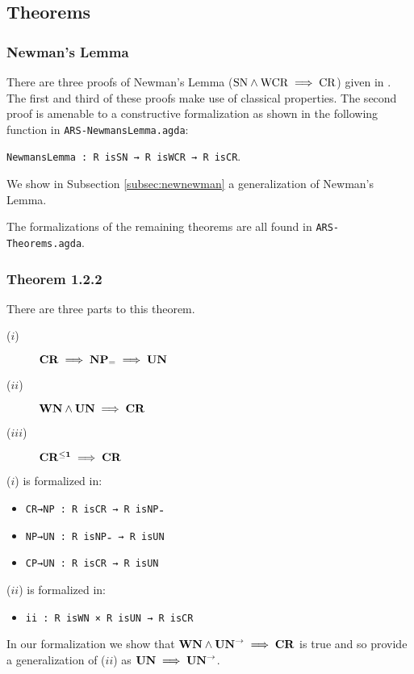 \subsection{Theorems}
\subsubsection{Newman's Lemma}
There are three proofs of Newman's Lemma ($\mathrm{SN} \land \mathrm{WCR} \implies \mathrm{CR}$) given in \terese. 
The first and third of these proofs make use of classical properties. The second proof is amenable to a 
constructive formalization as shown in the following function in \texttt{ARS-NewmansLemma.agda}:

\verb|NewmansLemma : R isSN → R isWCR → R isCR|.


We show in Subsection \ref{subsec:newnewman} a generalization of Newman's Lemma. 

The formalizations of the remaining theorems are all found in \texttt{ARS-Theorems.agda}. 
\subsubsection{Theorem 1.2.2}
There are three parts to this theorem. 
\begin{description}
    \item[($i$)] $\mathbf{CR} \implies \mathbf{NP_=} \implies \mathbf{UN}$
    \item[($ii$)] $\mathbf{WN} \land \mathbf{UN} \implies \mathbf{CR}$  
    \item[($iii$)] $\mathbf{CR^{\le 1}} \implies \mathbf{CR}$
\end{description}

($i$) is formalized in:
\begin{itemize}
    \item \verb|CR→NP : R isCR → R isNP₌|
    \item \verb|NP→UN : R isNP₌ → R isUN|
    \item \verb|CP→UN : R isCR → R isUN|
\end{itemize}

($ii$) is formalized in:
\begin{itemize}
    \item \verb|ii : R isWN × R isUN → R isCR|
\end{itemize}
In our formalization we show that $\mathbf{WN} \land \mathbf{UN}^{\to} \implies \mathbf{CR}$ is true and so provide a generalization of ($ii$) as $\mathbf{UN} \implies \mathbf{UN}^{\to}$. 


